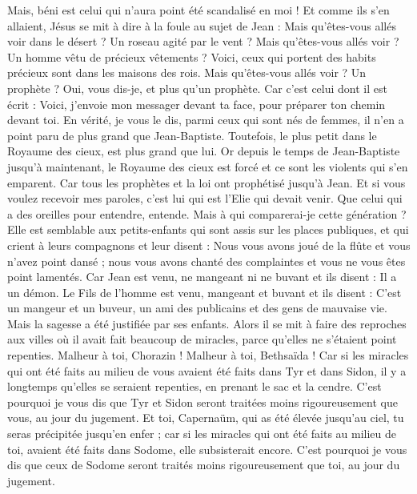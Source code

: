 \begin{multicols}{2}
Mais, béni est celui qui n'aura point été scandalisé en moi !
Et comme ils s'en allaient, Jésus se mit à dire à la foule au sujet de Jean : Mais qu'êtes-vous allés voir dans le désert ? Un roseau agité par le vent ?
Mais qu'êtes-vous allés voir ? Un homme vêtu de précieux vêtements ? Voici, ceux qui portent des habits précieux sont dans les maisons des rois.
Mais qu'êtes-vous allés voir ? Un prophète ? Oui, vous dis-je, et plus qu'un prophète.
Car c'est celui dont il est écrit : Voici, j'envoie mon messager devant ta face, pour préparer ton chemin devant toi.
En vérité, je vous le dis, parmi ceux qui sont nés de femmes, il n'en a point paru de plus grand que Jean-Baptiste. Toutefois, le plus petit dans le Royaume des cieux, est plus grand que lui.
Or depuis le temps de Jean-Baptiste jusqu'à maintenant, le Royaume des cieux est forcé et ce sont les violents qui s'en emparent.
Car tous les prophètes et la loi ont prophétisé jusqu'à Jean.
Et si vous voulez recevoir mes paroles, c'est lui qui est l'Elie qui devait venir.
Que celui qui a des oreilles pour entendre, entende.
Mais à qui comparerai-je cette génération ? Elle est semblable aux petits-enfants qui sont assis sur les places publiques, et qui crient à leurs compagnons
et leur disent : Nous vous avons joué de la flûte et vous n'avez point dansé ; nous vous avons chanté des complaintes et vous ne vous êtes point lamentés.
Car Jean est venu, ne mangeant ni ne buvant et ils disent : Il a un démon.
Le Fils de l'homme est venu, mangeant et buvant et ils disent : C'est un mangeur et un buveur, un ami des publicains et des gens de mauvaise vie. Mais la sagesse a été justifiée par ses enfants.
Alors il se mit à faire des reproches aux villes où il avait fait beaucoup de miracles, parce qu'elles ne s'étaient point repenties.
Malheur à toi, Chorazin ! Malheur à toi, Bethsaïda ! Car si les miracles qui ont été faits au milieu de vous avaient été faits dans Tyr et dans Sidon, il y a longtemps qu'elles se seraient repenties, en prenant le sac et la cendre.
C'est pourquoi je vous dis que Tyr et Sidon seront traitées moins rigoureusement que vous, au jour du jugement.
Et toi, Capernaüm, qui as été élevée jusqu'au ciel, tu seras précipitée jusqu'en enfer ; car si les miracles qui ont été faits au milieu de toi, avaient été faits dans Sodome, elle subsisterait encore.
C'est pourquoi je vous dis que ceux de Sodome seront traités moins rigoureusement que toi, au jour du jugement.

\end{multicols}
